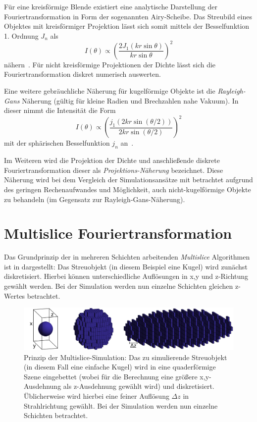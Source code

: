 Für eine kreisförmige Blende existiert eine analytische Darstellung der Fouriertransformation in Form der sogenannten Airy-Scheibe. Das Streubild eines Objektes mit kreisförmiger Projektion lässt sich somit mittels der Besselfunktion 1. Ordnung $J_n$ als
\begin{equation}
	I(\theta) \propto \left ( \frac{2 J_1(kr \sin \theta)}{kr \sin \theta} \right )^2 
\end{equation}
nähern~\cite{born1980}. Für nicht kreisförmige Projektionen der Dichte lässt sich die Fouriertransformation diskret numerisch auswerten.

Eine weitere gebräuchliche Näherung für kugelförmige Objekte ist die \textit{Rayleigh-Gans} Näherung (gültig für kleine Radien und Brechzahlen nahe Vakuum). In dieser nimmt die Intensität die Form
\begin{equation}
	I(\theta)\propto\left ( \frac{j_1(2kr\sin(\theta/2))}{2kr\sin(\theta/2)} \right )^2 
\end{equation}
mit der sphärischen Besselfunktion $j_n$ an~\cite{bohren2008}. 

Im Weiteren wird die Projektion der Dichte und anschließende diskrete Fouriertransformation dieser als \textit{Projektions-Näherung} bezeichnet. Diese Näherung wird bei dem Vergleich der Simulationsansätze mit betrachtet aufgrund des geringen Rechenaufwandes und Möglichkeit, auch nicht-kugelförmige Objekte zu behandeln (im Gegensatz zur Rayleigh-Gans-Näherung).


\section{Multislice Fouriertransformation}
Das Grundprinzip der in mehreren Schichten arbeitenden \textit{Multislice} Algorithmen ist in  dargestellt: Das Streuobjekt (in diesem Beispiel eine Kugel) wird zunächst diskretisiert. Hierbei können unterschiedliche Auflösungen in x,y und z-Richtung gewählt werden. Bei der Simulation werden nun einzelne Schichten gleichen z-Wertes betrachtet.
\begin{figure}
	\centering
	\includegraphics[width=1\textwidth]{images/multislice_sphere.png}
	\caption[Prinzip Multislice]{Prinzip der Multislice-Simulation: Das zu simulierende Streuobjekt (in diesem Fall eine einfache Kugel) wird in eine quaderförmige Szene eingebettet (wobei für die Berechnung eine größere x,y-Ausdehnung als z-Ausdehnung gewählt wird) und diskretisiert. Üblicherweise wird hierbei eine feiner Auflösung $\Delta z$ in Strahlrichtung gewählt. Bei der Simulation werden nun einzelne Schichten betrachtet.}
	\label{fig:multislice_prinzip}
\end{figure} 

